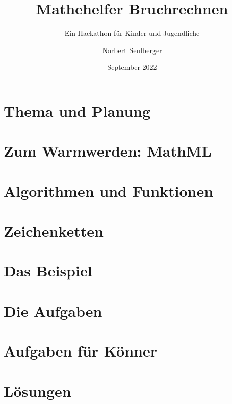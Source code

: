 \documentclass[12p,numbers=noendperiod,DIV=15]{scrreprt}
\begin{document}
	
\title{Mathehelfer Bruchrechnen}
\subtitle{Ein Hackathon für Kinder und Jugendliche}
\author{Norbert Seulberger}
\date{September 2022}

\maketitle

\tableofcontents

\chapter{Thema und Planung}






\chapter{Zum Warmwerden: MathML}




\chapter{Algorithmen und Funktionen}






\chapter{Zeichenketten}


\chapter{Das Beispiel}



\chapter{Die Aufgaben}





\chapter{Aufgaben für Könner}





\chapter{Lösungen}



\end{document}
